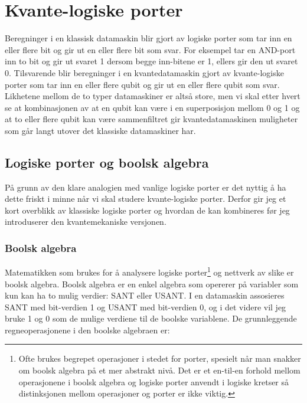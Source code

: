 \chapter{Kvante-logiske porter}

Beregninger i en klassisk datamaskin blir gjort av logiske porter som tar inn en eller flere bit og gir ut en eller flere bit som svar. For eksempel tar en AND-port inn to bit og gir ut svaret 1 dersom begge inn-bitene er 1, ellers gir den ut svaret 0. Tilsvarende blir beregninger i en kvantedatamaskin gjort av kvante-logiske porter som tar inn en eller flere qubit og gir ut en eller flere qubit som svar. Likhetene mellom de to typer datamaskiner er altså store, men vi skal etter hvert se at kombinasjonen av at en qubit kan være i en superposisjon mellom 0 og 1 og at to eller flere qubit kan være sammenfiltret gir kvantedatamaskinen muligheter som går langt utover det klassiske datamaskiner har.

\section{Logiske porter og boolsk algebra}
På grunn av den klare analogien med vanlige logiske porter er det nyttig å ha dette friskt i minne når vi skal studere kvante-logiske porter. Derfor gir jeg et kort overblikk av klassiske logiske porter og hvordan de kan kombineres før jeg introduserer den kvantemekaniske versjonen. 

\subsection{Boolsk algebra}
Matematikken som brukes for å analysere logiske porter\footnote{Ofte brukes begrepet operasjoner i stedet for porter, spesielt når man snakker om boolsk algebra på et mer abstrakt nivå. Det er et en-til-en forhold mellom operasjonene i boolsk algebra og logiske porter anvendt i logiske kretser så distinksjonen mellom operasjoner og porter er ikke viktig.} og nettverk av slike er boolsk algebra. Boolsk algebra er en enkel algebra som opererer på variabler som kun kan ha to mulig verdier: SANT eller USANT. I en datamaskin assosieres SANT med bit-verdien 1 og USANT med bit-verdien 0, og i det videre vil jeg bruke 1 og 0 som de mulige verdiene til de boolske variablene. De grunnleggende regneoperasjonene i den boolske algebraen er:

